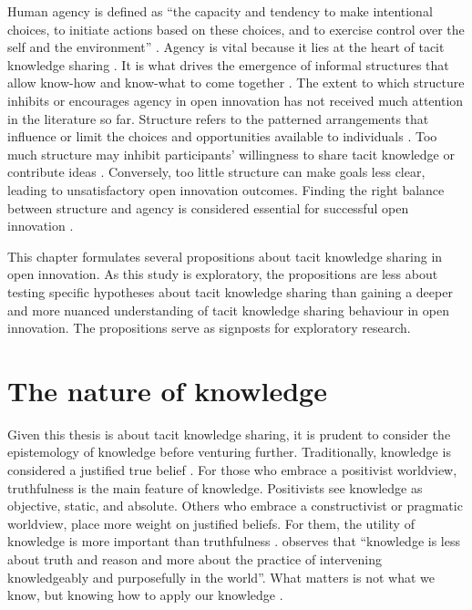 Human agency is defined as \enquote{the capacity and tendency to make intentional choices, to initiate actions based on these choices, and to exercise control over the self and the environment} \citep[][pg.~88]{goller2017human}. Agency is vital because it lies at the heart of tacit knowledge sharing \citep{polanyi1966tacit}. It is what drives the emergence of informal structures that allow know-how and know-what to come together \citep{lam2014tacit, hubrich2015embodiment}. The extent to which structure inhibits or encourages agency in open innovation has not received much attention in the literature so far. Structure refers to the patterned arrangements that influence or limit the choices and opportunities available to individuals \citep{bandura1999social}. Too much structure may inhibit participants' willingness to share tacit knowledge or contribute ideas \citep{lam2000tacit}. Conversely, too little structure can make goals less clear, leading to unsatisfactory open innovation outcomes. Finding the right balance between structure and agency is considered essential for successful open innovation \citep{davis2010agency}. \medskip

This chapter formulates several propositions about tacit knowledge sharing in open innovation. As this study is exploratory, the propositions are less about testing specific hypotheses about tacit knowledge sharing than gaining a deeper and more nuanced understanding of tacit knowledge sharing behaviour in open innovation. The propositions serve as signposts for exploratory research.

\section{The nature of knowledge}

Given this thesis is about tacit knowledge sharing, it is prudent to consider the epistemology of knowledge before venturing further. Traditionally, knowledge is considered a justified true belief \citep{bolisani2018elusive}. For those who embrace a positivist worldview, truthfulness is the main feature of knowledge. Positivists see knowledge as objective, static, and absolute. Others who embrace a constructivist or pragmatic worldview, place more weight on justified beliefs. For them, the utility of knowledge is more important than truthfulness \citep{bolisani2018elusive}. \citet{spender1996organizational} observes that \enquote{knowledge is less about truth and reason and more about the practice of intervening knowledgeably and purposefully in the world}. What matters is not what we know, but knowing how to apply our knowledge \citep{ryle2009concept,orlikowski2002knowing}. \medskip

